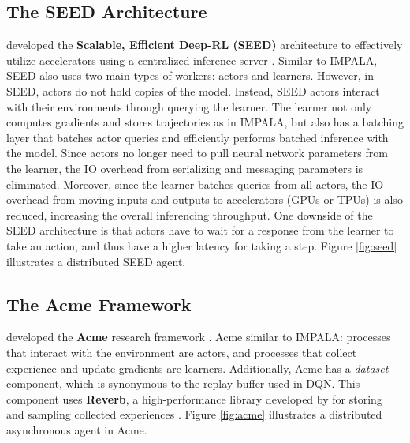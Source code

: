 \subsection{The SEED Architecture}
\citeauthor{SEEDRLScalable_Espeholt.Marinier.ea_2020} developed the \textbf{Scalable, Efficient Deep-RL (SEED)} architecture to effectively utilize accelerators using a centralized inference server \cite{SEEDRLScalable_Espeholt.Marinier.ea_2020}.
Similar to IMPALA, SEED also uses two main types of workers: actors and learners.
However, in SEED, actors do not hold copies of the model.
Instead, SEED actors interact with their environments through querying the learner.
The learner not only computes gradients and stores trajectories as in IMPALA, but also has a batching layer that batches actor queries and efficiently performs batched inference with the model.
Since actors no longer need to pull neural network parameters from the learner, the IO overhead from serializing and messaging parameters is eliminated.
Moreover, since the learner batches queries from all actors, the IO overhead from moving inputs and outputs to accelerators (GPUs or TPUs) is also reduced, increasing the overall inferencing throughput.
One downside of the SEED architecture is that actors have to wait for a response from the learner to take an action, and thus have a higher latency for taking a step.
Figure \ref{fig:seed} illustrates a distributed SEED agent.

\subsection{The Acme Framework}
\citeauthor{AcmeResearchFramework_Hoffman.Shahriari.ea_2020} developed the \textbf{Acme} research framework \cite{AcmeResearchFramework_Hoffman.Shahriari.ea_2020}.
Acme similar to IMPALA:
processes that interact with the environment are actors,
and processes that collect experience and update gradients are learners.
Additionally, Acme has a \textit{dataset} component, which is synonymous to the replay buffer used in DQN.
This component uses \textbf{Reverb}, a high-performance library developed by \citeauthor{ReverbFrameworkExperience_Cassirer.Barth-Maron.ea_2021} for storing and sampling collected experiences \cite{ReverbFrameworkExperience_Cassirer.Barth-Maron.ea_2021}.
Figure \ref{fig:acme} illustrates a distributed asynchronous agent in Acme.

